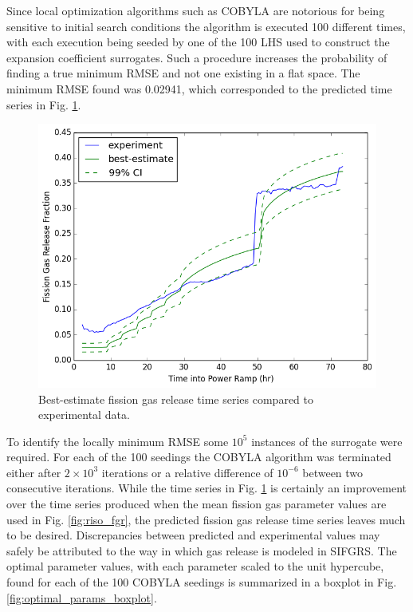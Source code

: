 Since local optimization algorithms such as \ac{COBYLA} are notorious for being sensitive to initial search conditions the algorithm is executed 100 different times, with each execution being seeded by one of the 100 \ac{LHS} used to construct the expansion coefficient surrogates. Such a procedure increases the probability of finding a true minimum \ac{RMSE} and not one existing in a flat space. The minimum \ac{RMSE} found was 0.02941, which corresponded to the predicted time series in Fig. \ref{fig:fgr_best_estimate}. 
\begin{figure}[!h]
\caption{\label{fig:fgr_best_estimate}
Best-estimate fission gas release time series compared to experimental data.}
 \begin{center}
  \includegraphics[scale=.75]{./Chapter4/fgr_best_estimate.png}
 \end{center}
\end{figure}
To identify the locally minimum \ac{RMSE} some $10^5$ instances of the surrogate were required. For each of the 100 seedings the \ac{COBYLA} algorithm was terminated either after $2\times 10^3$ iterations or a relative difference of $10^{-6}$ between two consecutive iterations. While the time series in Fig. \ref{fig:fgr_best_estimate} is certainly an improvement over the time series produced when the mean fission gas parameter values are used in Fig. \ref{fig:riso_fgr}, the predicted fission gas release time series leaves much to be desired. Discrepancies between predicted and experimental values may safely be attributed to the way in which gas release is modeled in \ac{SIFGRS}. The optimal parameter values, with each parameter scaled to the unit hypercube, found for each of the 100 \ac{COBYLA} seedings is summarized in a boxplot in Fig. \ref{fig:optimal_params_boxplot}.    
